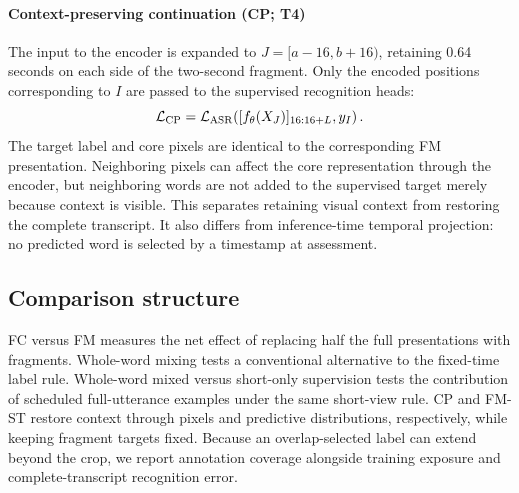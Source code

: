 \paragraph{Context-preserving continuation (CP; T4)}
The input to the encoder is expanded to $J=[a-16,b+16)$, retaining 0.64 seconds on
each side of the two-second fragment. Only the encoded positions corresponding to
$I$ are passed to the supervised recognition heads:
\begin{equation}
 \mathcal L_{\rm CP}
 =\mathcal L_{\rm ASR}\!\left(
          [f_\theta(X_J)]_{16:16+L},y_I\right).
 \label{eq:context}
\end{equation}
The target label and core pixels are identical to the corresponding FM
presentation. Neighboring pixels can affect the core representation through the
encoder, but neighboring words are not added to the supervised target merely
because context is visible. This separates retaining visual context from
restoring the complete transcript. It also differs from inference-time temporal
projection: no predicted word is selected by a timestamp at assessment.

\subsection{Comparison structure}
FC versus FM measures the net effect of replacing half the full presentations
with fragments. Whole-word mixing tests a conventional alternative to the
fixed-time label rule. Whole-word mixed versus short-only supervision tests
the contribution of scheduled full-utterance examples under the same short-view
rule. CP and FM-ST restore context through pixels and predictive
distributions, respectively, while keeping fragment targets fixed. Because an
overlap-selected label can extend beyond the crop, we report annotation coverage
alongside training exposure and complete-transcript recognition error.
